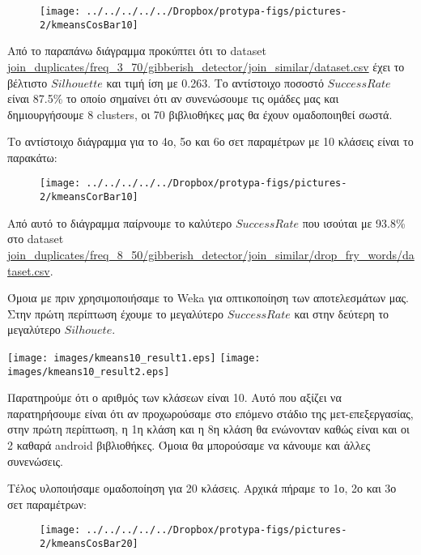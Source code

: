 \begin{figure}
\centering
\texttt{[image: ../../../../../Dropbox/protypa-figs/pictures-2/kmeansCosBar10]}
\caption{}
\label{fig:kmeansCosBar10}
\end{figure}

Από το παραπάνω διάγραμμα προκύπτει ότι το dataset \url{join_duplicates/freq_3_70/gibberish_detector/join_similar/dataset.csv} έχει το βέλτιστο $Silhouette$ και τιμή ίση με 0.263. Το αντίστοιχο ποσοστό $SuccessRate$ είναι 87.5\% το οποίο σημαίνει ότι αν συνενώσουμε τις ομάδες μας και δημιουργήσουμε 8 clusters, οι 70 βιβλιοθήκες μας θα έχουν ομαδοποιηθεί σωστά.

Το αντίστοιχο διάγραμμα για το 4ο, 5ο και 6ο σετ παραμέτρων με 10 κλάσεις είναι το παρακάτω:
\begin{figure}
\centering
\texttt{[image: ../../../../../Dropbox/protypa-figs/pictures-2/kmeansCorBar10]}
\caption{}
\label{fig:kmeansCorBar10}
\end{figure}

Από αυτό το διάγραμμα παίρνουμε το καλύτερο $SuccessRate$ που ισούται με 93.8\% στο dataset \url{join_duplicates/freq_8_50/gibberish_detector/join_similar/drop_fry_words/dataset.csv}.

Όμοια με πριν χρησιμοποιήσαμε το Weka για οπτικοποίηση των αποτελεσμάτων μας. Στην πρώτη περίπτωση έχουμε το μεγαλύτερο $Success Rate$ και στην δεύτερη το μεγαλύτερο $Silhouete$.

\noindent\begin{minipage}{\linewidth}
    \centering
    \texttt{[image: images/kmeans10\_result1.eps]}
    \texttt{[image: images/kmeans10\_result2.eps]}
    \label{fig:kmeans10_result}
\end{minipage}

Παρατηρούμε ότι ο αριθμός των κλάσεων είναι 10. Αυτό που αξίζει να παρατηρήσουμε είναι ότι αν προχωρούσαμε στο επόμενο στάδιο της μετ-επεξεργασίας, στην πρώτη περίπτωση, η 1η κλάση και η 8η κλάση θα ενώνονταν καθώς είναι και οι 2 καθαρά android βιβλιοθήκες. Όμοια θα μπορούσαμε να κάνουμε και άλλες συνενώσεις.

Τέλος υλοποιήσαμε ομαδοποίηση για 20 κλάσεις. Αρχικά πήραμε το 1ο, 2ο και 3ο σετ παραμέτρων:\\
\begin{figure}
\centering
\texttt{[image: ../../../../../Dropbox/protypa-figs/pictures-2/kmeansCosBar20]}
\caption{}
\label{fig:kmeansCosBar20}
\end{figure}

